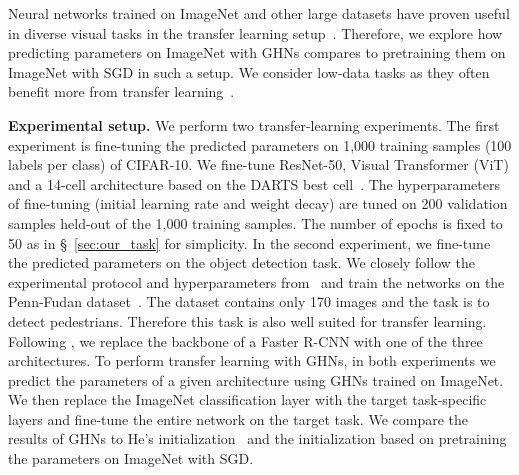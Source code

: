 Neural networks trained on ImageNet and other large datasets have proven useful in diverse visual tasks in the transfer learning setup~\citep{kornblith2019better,huh2016makes,neyshabur2020being,raghu2019transfusion,zhai2019large,dosovitskiy2020image}. 
Therefore, we explore how predicting parameters on ImageNet with GHNs compares to pretraining them on ImageNet with SGD in such a setup. 
We consider low-data tasks as they often benefit more from transfer learning~\citep{raghu2019transfusion,zhai2019large}.

\textbf{Experimental setup.}
We perform two transfer-learning experiments. The first experiment is fine-tuning the predicted parameters on 1,000 training samples (100 labels per class) of CIFAR-10. 
We fine-tune ResNet-50, Visual Transformer (ViT) and a 14-cell architecture based on the DARTS best cell~\citep{liu2018darts}. The hyperparameters of fine-tuning (initial learning rate and weight decay) are tuned on 200 validation samples held-out of the 1,000 training samples. The number of epochs is fixed to 50 as in \S~\ref{sec:our_task} for simplicity.
In the second experiment, we fine-tune the predicted parameters on the object detection task. We closely follow the experimental protocol and hyperparameters from~\citep{pytorchdetection} and train the networks on the Penn-Fudan dataset~\citep{wang2007object}. The dataset contains only 170 images and the task is to detect pedestrians. Therefore this task is also well suited for transfer learning. Following \citep{pytorchdetection}, we replace the backbone of a Faster R-CNN with one of the three architectures.
To perform transfer learning with GHNs, in both experiments we predict the parameters of a given architecture using GHNs trained on ImageNet. 
We then replace the ImageNet classification layer with the target task-specific layers and fine-tune the entire network on the target task.
We compare the results of GHNs to He's initialization~\citep{he2015delving} and the initialization based on pretraining the parameters on ImageNet with SGD.


